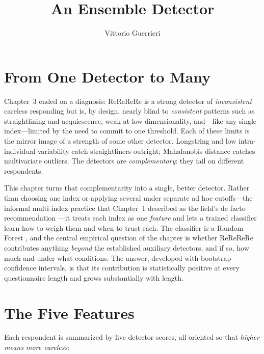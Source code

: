 \documentclass[doc,11pt,donotrepeattitle]{apa7}
\title{An Ensemble Detector}
\author{Vittorio Guerrieri}
\affiliation{Chapter~4 of the thesis}
\begin{document}
\maketitle

\section{From One Detector to Many}

Chapter~3 ended on a diagnosis: ReReReRe is a strong detector of
\emph{inconsistent} careless responding but is, by design, nearly blind to
\emph{consistent} patterns such as straightlining and acquiescence, weak at low
dimensionality, and---like any single index---limited by the need to commit to
one threshold. Each of these limits is the mirror image of a strength of some
other detector. Longstring and low intra-individual variability catch
straightliners outright; Mahalanobis distance catches multivariate outliers.
The detectors are \emph{complementary}: they fail on different respondents.

This chapter turns that complementarity into a single, better detector. Rather
than choosing one index or applying several under separate ad hoc cutoffs---the
informal multi-index practice that Chapter~1 described as the field's de facto
recommendation \parencite{curran2016methods, ward2023dealing}---it treats each
index as one \emph{feature} and lets a trained classifier learn how to weigh
them and when to trust each. The classifier is a Random Forest
\parencite{breiman2001random}, and the central empirical question of the chapter
is whether ReReReRe contributes anything \emph{beyond} the established
auxiliary detectors, and if so, how much and under what conditions. The answer,
developed with bootstrap confidence intervals, is that its contribution is
statistically positive at every questionnaire length and grows substantially
with length.

\section{The Five Features}

Each respondent is summarized by five detector scores, all oriented so that
\emph{higher means more careless}:
\end{document}
